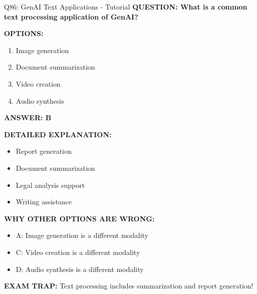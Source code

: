 \documentclass[8pt]{beamer}
\begin{document}
	\begin{frame}{Q86: GenAI Text Applications - Tutorial}
		\fontsize{6.5}{7.5}\selectfont
		\textbf{QUESTION: What is a common text processing application of GenAI?}
		
		\vspace{0.1cm}
		\textbf{OPTIONS:}
		\begin{enumerate}
			\item Image generation
			\item Document summarization
			\item Video creation
			\item Audio synthesis
		\end{enumerate}
		
		\vspace{0.1cm}
		\textcolor{myblue}{\textbf{ANSWER: B}}
		
		\vspace{0.1cm}
		\textbf{DETAILED EXPLANATION:}
		\begin{itemize}
			\item Report generation
			\item Document summarization
			\item Legal analysis support
			\item Writing assistance
		\end{itemize}
		
		\vspace{0.1cm}
		\textcolor{myred}{\textbf{WHY OTHER OPTIONS ARE WRONG:}}
		\begin{itemize}
			\item \textcolor{myred}{A:} Image generation is a different modality
			\item \textcolor{myred}{C:} Video creation is a different modality
			\item \textcolor{myred}{D:} Audio synthesis is a different modality
		\end{itemize}
		
		\textcolor{myred}{\textbf{EXAM TRAP:}} Text processing includes \textcolor{myblue}{summarization and report generation}!
	\end{frame}
	
\end{document}
